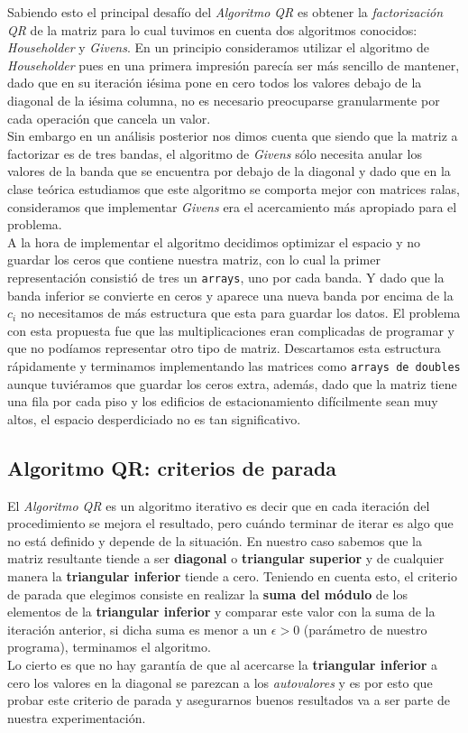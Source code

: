 \documentclass[a4paper]{article}
\begin{document}
Sabiendo esto el principal desafío del \textit{Algoritmo QR} es obtener la \textit{factorización QR} de la matriz para lo cual tuvimos en cuenta dos algoritmos conocidos: \textit{Householder} y \textit{Givens}.
En un principio consideramos utilizar el algoritmo de \textit{Householder} pues en una primera impresión parecía ser más sencillo de mantener, dado que en su iteración iésima pone en cero todos los valores debajo de la diagonal de la iésima columna, no es necesario preocuparse granularmente por cada operación que cancela un valor.\\
Sin embargo en un análisis posterior nos dimos cuenta que siendo que la matriz a factorizar es de tres bandas, el algoritmo de \textit{Givens} sólo necesita anular los valores de la banda que se encuentra por debajo de la diagonal y dado que en la clase teórica estudiamos que este algoritmo se comporta mejor con matrices ralas, consideramos que implementar \textit{Givens} era el acercamiento más apropiado para el problema.\\

A la hora de implementar el algoritmo decidimos optimizar el espacio y no guardar los ceros que contiene nuestra matriz, con lo cual la primer representación consistió de tres un \texttt{arrays}, uno por cada banda. Y dado que la banda inferior se convierte en ceros y aparece una nueva banda por encima de la $c_i$ no necesitamos de más estructura que esta para guardar los datos. El problema con esta propuesta fue que las multiplicaciones eran complicadas de programar y que no podíamos representar otro tipo de matriz. Descartamos esta estructura rápidamente y terminamos implementando las matrices como \texttt{arrays de doubles} aunque tuviéramos que guardar los ceros extra, además, dado que la matriz tiene una fila por cada piso y los edificios de estacionamiento difícilmente sean muy altos, el espacio desperdiciado no es tan significativo.

\subsection{Algoritmo QR: criterios de parada}

El \textit{Algoritmo QR} es un algoritmo iterativo es decir que en cada iteración del procedimiento se mejora el resultado, pero cuándo terminar de iterar es algo que no está definido y depende de la situación. En nuestro caso sabemos que la matriz resultante tiende a ser \textbf{diagonal} o \textbf{triangular superior} y de cualquier manera la \textbf{triangular inferior} tiende a cero. Teniendo en cuenta esto, el criterio de parada que elegimos consiste en realizar la \textbf{suma del módulo} de los elementos de la \textbf{triangular inferior} y comparar este valor con la suma de la iteración anterior, si dicha suma es menor a un $\epsilon > 0$ (parámetro de nuestro programa), terminamos el algoritmo.\\
Lo cierto es que no hay garantía de que al acercarse la \textbf{triangular inferior} a cero los valores en la diagonal se parezcan a los \textit{autovalores} y es por esto que probar este criterio de parada y asegurarnos buenos resultados va a ser parte de nuestra experimentación.
\end{document}
